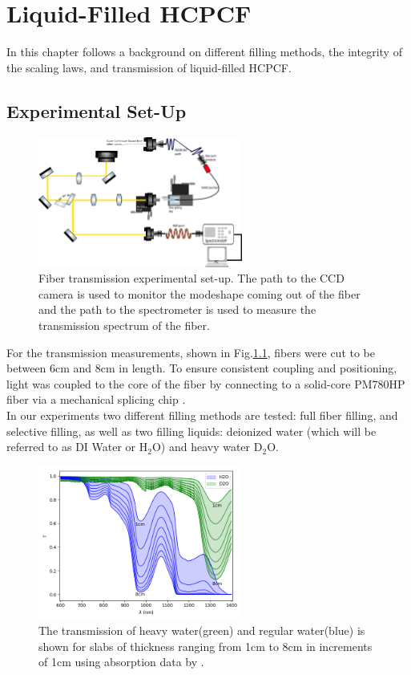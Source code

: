 \chapter{Liquid-Filled HCPCF}
In this chapter follows a background on different filling methods, the integrity of the scaling laws, and transmission of liquid-filled HCPCF.
\section{Experimental Set-Up}
\begin{figure}[!htb]
	\centering
	\includegraphics[width=0.6\textwidth]{./Figures/fiberfilling/Transmission_SetUp.png}
	\caption{Fiber transmission experimental set-up. The path to the CCD camera is used to monitor the modeshape coming out of the fiber and the path to the spectrometer is used to measure the transmission spectrum of the fiber.}
	\label{fig:filling exp}
\end{figure}
For the transmission measurements, shown in Fig.\ref{fig:filling exp}, fibers were cut to be between 6cm and 8cm in length. To ensure consistent coupling and positioning, light was coupled to the core of the fiber by connecting to a solid-core PM780HP fiber via a mechanical splicing chip \cite{maruf}.\\
In our experiments two different filling methods are tested: full fiber filling, and selective filling, as well as two filling liquids: deionized water (which will be referred to as DI Water or H${}_2$O) and heavy water D${}_2$O.
\begin{figure}[!htb]
	\centering
	\includegraphics[width=0.6\textwidth]{./Figures/fiberfilling/water_transmission/water_transmission.png}
	\caption{The transmission of heavy water(green) and regular water(blue) is shown for slabs of thickness ranging from 1cm to 8cm in increments of 1cm using absorption data by \cite{kedenburg}. }
	\label{fig:water transmission}
\end{figure}
